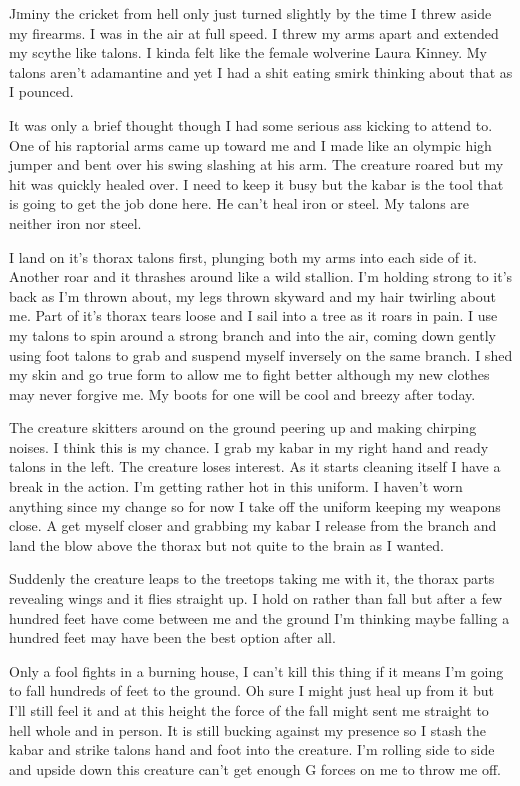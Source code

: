 \lettrine[lines=2,lraise=0]{J}iminy the cricket from hell only just turned slightly by the time I threw aside my firearms. I was in the air at full speed. I threw my arms apart and extended my scythe like talons. I kinda felt like the female wolverine Laura Kinney. My talons aren't adamantine and yet I had a shit eating smirk thinking about that as I pounced.

It was only a brief thought though I had some serious ass kicking to attend to. One of his raptorial arms came up toward me and I made like an olympic high jumper and bent over his swing slashing at his arm. The creature roared but my hit was quickly healed over. I need to keep it busy but the kabar is the tool that is going to get the job done here. He can't heal iron or steel. My talons are neither iron nor steel.

I land on it's thorax talons first, plunging both my arms into each side of it. Another roar and it thrashes around like a wild stallion. I'm holding strong to it's back as I'm thrown about, my legs thrown skyward and my hair twirling about me. Part of it's thorax tears loose and I sail into a tree as it roars in pain. I use my talons to spin around a strong branch and into the air, coming down gently using foot talons to grab and suspend myself inversely on the same branch. I shed my skin and go true form to allow me to fight better although my new clothes may never forgive me. My boots for one will be cool and breezy after today.

The creature skitters around on the ground peering up and making chirping noises. I think this is my chance. I grab my kabar in my right hand and ready talons in the left. The creature loses interest. As it starts cleaning itself I have a break in the action. I'm getting rather hot in this uniform. I haven't worn anything since my change so for now I take off the uniform keeping my weapons close. A get myself closer and grabbing my kabar I release from the branch and land the blow above the thorax but not quite to the brain as I wanted.

Suddenly the creature leaps to the treetops taking me with it, the thorax parts revealing wings and it flies straight up. I hold on rather than fall but after a few hundred feet have come between me and the ground I'm thinking maybe falling a hundred feet may have been the best option after all.

Only a fool fights in a burning house, I can't kill this thing if it means I'm going to fall hundreds of feet to the ground. Oh sure I might just heal up from it but I'll still feel it and at this height the force of the fall might sent me straight to hell whole and in person. It is still bucking against my presence so I stash the kabar and strike talons hand and foot into the creature. I'm rolling side to side and upside down this creature can't get enough G forces on me to throw me off.

